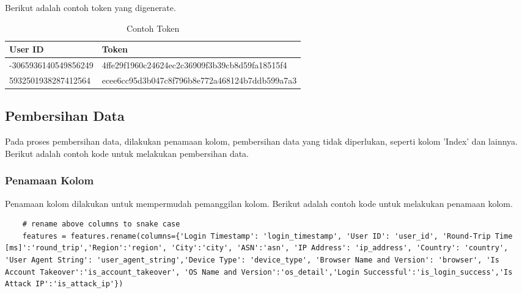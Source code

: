 Berikut adalah contoh token yang digenerate.

\begin{table}[H]
    \begin{tabular}{|l|l|}
    \hline
    \textbf{User ID} & \textbf{Token} \\ \hline
    -3065936140549856249 & 4ffe29f1960c24624ec2c36909f3b39cb8d59fa18515f4 \\
    5932501938287412564 & ecee6cc95d3b047c8f796b8e772a468124b7ddb599a7a3 \\ \hline
    \end{tabular}
    \caption{Contoh Token}
    \label{tab:token}
    \end{table}

\subsection{Pembersihan Data}
Pada proses pembersihan data, dilakukan penamaan kolom, pembersihan data yang tidak diperlukan, seperti kolom 'Index' dan lainnya. Berikut adalah contoh kode untuk melakukan pembersihan data.

\subsubsection{Penamaan Kolom}
Penamaan kolom dilakukan untuk mempermudah pemanggilan kolom. Berikut adalah contoh kode untuk melakukan penamaan kolom.

\begin{lstlisting}
    # rename above columns to snake case
    features = features.rename(columns={'Login Timestamp': 'login_timestamp', 'User ID': 'user_id', 'Round-Trip Time [ms]':'round_trip','Region':'region', 'City':'city', 'ASN':'asn', 'IP Address': 'ip_address', 'Country': 'country', 'User Agent String': 'user_agent_string','Device Type': 'device_type', 'Browser Name and Version': 'browser', 'Is Account Takeover':'is_account_takeover', 'OS Name and Version':'os_detail','Login Successful':'is_login_success','Is Attack IP':'is_attack_ip'})
    \end{lstlisting}


